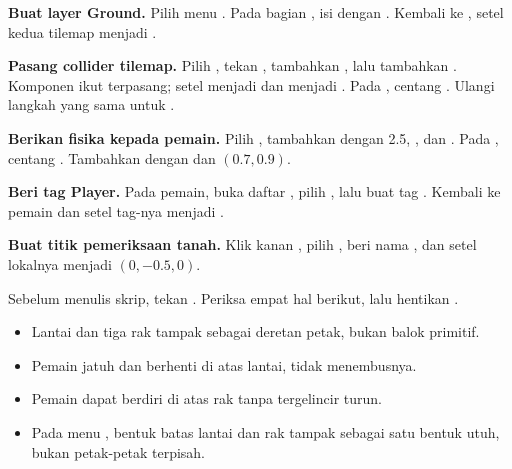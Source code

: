 \begin{langkah}
  \item \textbf{Buat layer Ground.} Pilih menu
        . Pada bagian
        , isi  dengan . Kembali
        ke , setel  kedua tilemap menjadi
        .

  \item \textbf{Pasang collider tilemap.} Pilih , tekan
        , tambahkan , lalu
        tambahkan . Komponen 
        ikut terpasang; setel  menjadi  dan
         menjadi . Pada
        , centang . Ulangi
        langkah yang sama untuk .

  \item \textbf{Berikan fisika kepada pemain.} Pilih , tambahkan
         dengan  2.5,
         , dan
         . Pada ,
        centang . Tambahkan 
        dengan   dan  $(0.7,0.9)$.

  \item \textbf{Beri tag Player.} Pada  pemain, buka daftar
        , pilih , lalu buat tag . Kembali
        ke pemain dan setel tag-nya menjadi .

  \item \textbf{Buat titik pemeriksaan tanah.} Klik kanan ,
        pilih , beri nama , dan setel
         lokalnya menjadi $(0,-0.5,0)$.
\end{langkah}

\begin{ujibox}
Sebelum menulis skrip, tekan . Periksa empat hal berikut, lalu
hentikan .
\begin{itemize}[leftmargin=1.4em, itemsep=0.2em]
  \item Lantai dan tiga rak tampak sebagai deretan petak, bukan balok
        primitif.
  \item Pemain jatuh dan berhenti di atas lantai, tidak menembusnya.
  \item Pemain dapat berdiri di atas rak tanpa tergelincir turun.
  \item Pada menu , bentuk batas
        lantai dan rak tampak sebagai satu bentuk utuh, bukan petak-petak
        terpisah.
\end{itemize}
\end{ujibox}

